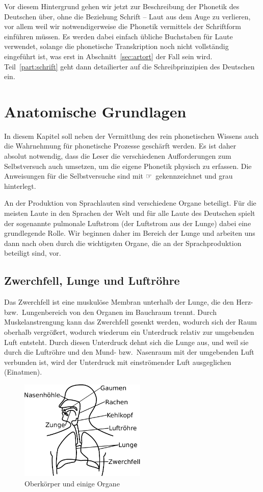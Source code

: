 Vor diesem Hintergrund gehen wir jetzt zur Beschreibung der Phonetik des Deutschen über, ohne die Beziehung Schrift -- Laut aus dem Auge zu verlieren, vor allem weil wir notwendigerweise die Phonetik vermittels der Schriftform einführen müssen.
Es werden dabei einfach übliche Buchstaben für Laute verwendet, solange die phonetische Transkription noch nicht vollständig eingeführt ist, was erst in Abschnitt~\ref{sec:artort} der Fall sein wird.
Teil~\ref{part:schrift} geht dann detailierter auf die Schreibprinzipien des Deutschen ein.

\section{Anatomische Grundlagen}

\label{sec:anatomischegrundlagen}

In diesem Kapitel soll neben der Vermittlung des rein phonetischen Wissens auch die Wahrnehmung für phonetische Prozesse geschärft werden.
Es ist daher absolut notwendig, dass die Leser die verschiedenen Aufforderungen zum Selbstversuch auch umsetzen, um die eigene Phonetik physisch zu erfassen.
Die Anweisungen für die Selbstversuche sind mit ☞\ gekennzeichnet und grau hinterlegt.

An der Produktion von Sprachlauten sind verschiedene Organe beteiligt.
Für die meisten Laute in den Sprachen der Welt und für alle Laute des Deutschen spielt der sogenannte pulmonale Luftstrom (der Luftstrom aus der Lunge) dabei eine grundlegende Rolle.
Wir beginnen daher im Bereich der Lunge und arbeiten uns dann nach oben durch die wichtigsten Organe, die an der Sprachproduktion beteiligt sind, vor.

\subsection{Zwerchfell, Lunge und Luftröhre}

Das Zwerchfell ist eine muskulöse Membran unterhalb der Lunge, die den Herz- bzw.\ Lungenbereich von den Organen im Bauchraum trennt.
Durch Muskelanstrengung kann das Zwerchfell gesenkt werden, wodurch sich der Raum oberhalb vergrößert, wodurch wiederum ein Unterdruck relativ zur umgebenden Luft entsteht.
Durch diesen Unterdruck dehnt sich die Lunge aus, und weil sie durch die Luftröhre und den Mund- bzw.\ Nasenraum mit der umgebenden Luft verbunden ist, wird der Unterdruck mit einströmender Luft ausgeglichen (Einatmen).

\begin{figure}[!h]
  \centering
  \includegraphics[width=6cm]{figures/ueberblick}
  \caption{Oberkörper und einige Organe}
  \label{fig:lunge}
\end{figure}

